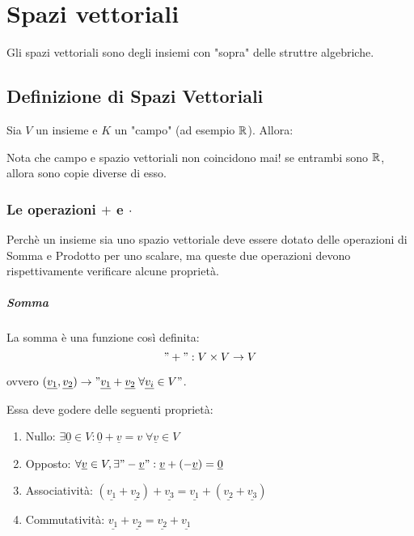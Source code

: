 \chapter{Spazi vettoriali}
Gli spazi vettoriali sono degli insiemi con "sopra" delle struttre algebriche.

\section{Definizione di Spazi Vettoriali}
Sia $V$ un insieme e $K$ un "campo" (ad esempio $\mathbb{R}$).
Allora:

Nota che campo e spazio vettoriali non coincidono mai! se entrambi sono $\mathbb{R}$, allora sono copie diverse di esso.
\subsection{Le operazioni $+$ e $\cdot$}
Perchè un insieme sia uno spazio vettoriale deve essere dotato delle operazioni di Somma e Prodotto per uno scalare,
ma queste due operazioni devono rispettivamente verificare alcune proprietà.

\paragraph{Somma}
La somma è una funzione così definita:
\["+" : V \times V \to V \]
\begin{center}
    ovvero $(\underline{v_1}, \underline{v_2} ) \to "\underline{v_1} + \underline{v_2}\; \forall \underline{v_i} \in V"$.
\end{center}
    Essa deve godere delle seguenti proprietà:
\begin{enumerate}
    \item Nullo: $\exists \underline{0} \in V : \underline{0} + \underline{v} = v \; \forall \underline{v} \in V$
    \item Opposto: $\forall \underline{v} \in V, \exists "-\underline{v}" : \underline{v} + (-\underline{v}) = \underline{0}$
    \item Associatività: $(\underline{v_1} + \underline{v_2}) + \underline{v_3} = \underline{v_1} + (\underline{v_2} + \underline{v_3})$
    \item Commutatività: $\underline{v_1} + \underline{v_2} = \underline{v_2} + \underline{v_1}$
\end{enumerate}

